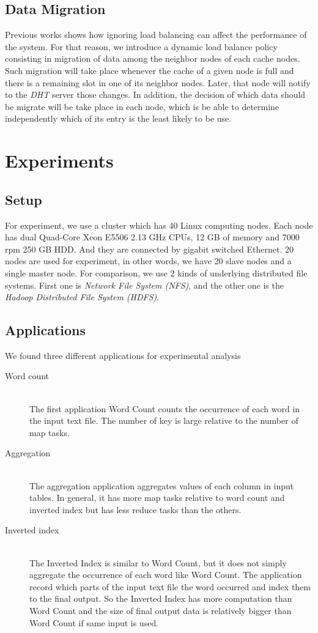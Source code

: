 \documentclass[nocopyrightspace]{sigplanconf}
\begin{document}
\subsection*{Data Migration}
Previous works shows how ignoring load balancing can affect the performance of the system.
For that reason, we introduce a dynamic load balance policy consisting in migration of data among
the neighbor nodes of each cache nodes. Such migration will take place whenever the cache of a given node is full 
and there is a remaining slot in one of its neighbor nodes. Later, that node will notify to the \textit{DHT} server 
those changes. In addition, the decision of which data should be migrate will be take place in each node,
which is be able to determine independently which of its entry is the least likely to be use.

\section*{Experiments}
\subsection*{Setup}
For experiment, we use a cluster which has 40 Linux computing nodes. Each node has dual Quad-Core Xeon E5506 2.13 GHz CPUs,
12 GB of memory and 7000 rpm 250 GB HDD. And they are connected by gigabit switched Ethernet. 
20 nodes are used for experiment, in other words, we have 20 slave nodes and a single master node.
For comparison, we use 2 kinds of underlying distributed file systems. First one is \textit{Network File System (NFS)}, 
and the other one is the \textit{Hadoop Distributed File System (HDFS)}.

\subsection*{Applications}
We found three different applications for experimental analysis

\begin{description}
\item[Word count] \hfill \\
The first application Word Count counts the occurrence of each word in the input text file. 
The number of key is large relative to the number of map tasks.

\item[Aggregation] \hfill \\
The aggregation application aggregates values of each column in input tables. In general, 
it has more map tasks relative to word count and inverted index but has less reduce tasks than the others.

\item[Inverted index] \hfill \\
The Inverted Index is similar to Word Count, but it does not simply aggregate the occurrence 
of each word like Word Count. The application record which parts of the input text file the word occurred and 
index them to the final output. So the Inverted Index has more computation than Word Count and the size of 
final output data is relatively bigger than Word Count if same input is used.
\end{description}
\end{document}
